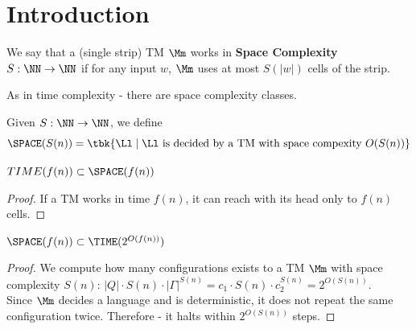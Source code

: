 \section{Introduction}
\begin{yellowBox}
	\begin{defn}
		We say that a (single strip) TM $\Mm$ works in \textbf{Space Complexity} $S:\NN\to \NN$ if for any input $w$, $\Mm$ uses at most $S(|w|)$ cells of the strip.
	\end{defn}
\end{yellowBox}
As in time complexity - there are space complexity classes.
\begin{yellowBox}
	\begin{defn}
		Given $S:\NN\to \NN$, we define $$\SPACE(S(n)) = \tbk{\Ll\mid \Ll\text{ is decided by a TM with space compexity } O(S(n))}$$
	\end{defn}
\end{yellowBox}
\begin{blueBox}
	\begin{thm}
		$TIME(f(n))\subset \SPACE(f(n))$
	\end{thm}
\end{blueBox}
\begin{proof}
	If a TM works in time $f(n)$, it can reach with its head only to $f(n)$ cells.
\end{proof}
\begin{blueBox}
	\begin{thm}
		$\SPACE(f(n))\subset \TIME(2^{O(f(n))})$
	\end{thm}
\end{blueBox}
\begin{proof}
	We compute how many configurations exists to a TM $\Mm$ with space complexity $S(n)$: $|Q|\cdot S(n) \cdot |\Gamma|^{S(n)} = c_1 \cdot S(n) \cdot c_2^{S(n)} = 2^{O(S(n))}$.\\
	Since $\Mm$ decides a language and is deterministic, it does not repeat the same configuration twice. Therefore - it halts within $2^{O(S(n))}$ steps.
\end{proof}
